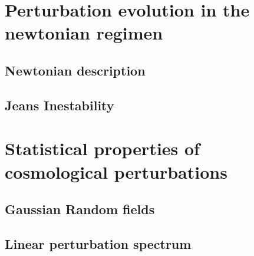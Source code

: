 \section{ Perturbation evolution in the newtonian regimen }

\subsection{ Newtonian description  }
\subsection{ Jeans Inestability}



\section{ Statistical properties of cosmological perturbations }
\subsection{ Gaussian Random fields }
\subsection{ Linear perturbation spectrum }

